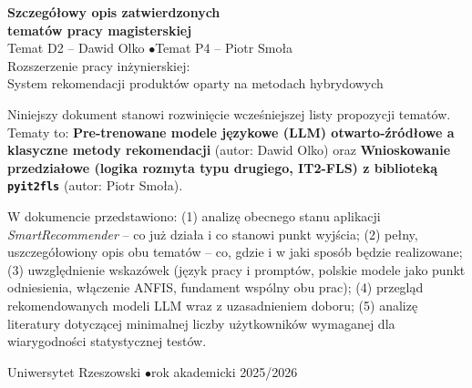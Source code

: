 \documentclass[12pt,a4paper]{article}
\begin{document}
\begin{titlepage}
\null\vspace*{3cm}
\begin{center}
{\color{primary}\Huge\bfseries Szczegółowy opis zatwierdzonych\\[0.3em] tematów pracy magisterskiej}\\[1.4em]
{\color{greytxt}\Large Temat D2 -- Dawid Olko \quad$\bullet$\quad Temat P4 -- Piotr Smoła}\\[0.8em]
{\color{greytxt}\large Rozszerzenie pracy inżynierskiej:\\ System rekomendacji produktów oparty na metodach hybrydowych}
\end{center}

\vspace{2cm}

Niniejszy dokument stanowi rozwinięcie wcześniejszej listy propozycji tematów. Tematy to: \textbf{Pre-trenowane modele językowe (LLM) otwarto-źródłowe a klasyczne metody rekomendacji} (autor: Dawid Olko) oraz \textbf{Wnioskowanie przedziałowe (logika rozmyta typu drugiego, IT2-FLS) z biblioteką \texttt{pyit2fls}} (autor: Piotr Smoła).

\vspace{0.4em}

W dokumencie przedstawiono: (1) analizę obecnego stanu aplikacji \emph{SmartRecommender} -- co już działa i co stanowi punkt wyjścia; (2) pełny, uszczegółowiony opis obu tematów -- co, gdzie i w jaki sposób będzie realizowane; (3) uwzględnienie wskazówek (język pracy i promptów, polskie modele jako punkt odniesienia, włączenie ANFIS, fundament wspólny obu prac); (4) przegląd rekomendowanych modeli LLM wraz z uzasadnieniem doboru; (5) analizę literatury dotyczącej minimalnej liczby użytkowników wymaganej dla wiarygodności statystycznej testów.

\vfill
\begin{center}
{\color{greytxt}Uniwersytet Rzeszowski \quad$\bullet$\quad rok akademicki 2025/2026}
\end{center}
\end{titlepage}

\tableofcontents
\newpage

\end{document}
